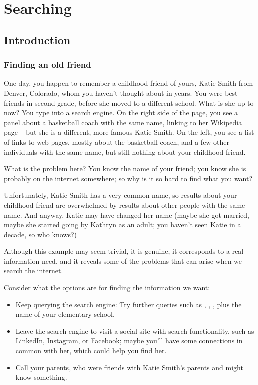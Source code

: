 \chapter{Searching}
\label{ch:searching}

\section{Introduction}
\label{sec:search-intro}

\subsection{Finding an old friend}

One day, you happen to remember a childhood friend of yours, Katie Smith from Denver, Colorado, whom you haven't thought about in  years.  You were best friends in second grade, before she moved to a different school.  What is she up to now?  You type  into a search engine.  On the right side of the page, you see a panel about a basketball coach with the same name, linking to her Wikipedia page -- but she is a different, more famous Katie Smith.  On the left, you see a list of links to web pages, mostly about the basketball coach, and a few other individuals with the same name, but still nothing about your childhood friend.

What is the problem here?  You know the name of your friend; you know she is probably on the internet somewhere; so why is it so hard to find what you want? 

Unfortunately, Katie Smith has a very common name, so results about your childhood friend are overwhelmed by results about other people with the same name.  And anyway, Katie may have changed her name (maybe she got married, maybe she started going by Kathryn  as an adult; you haven't seen Katie in a decade, so who knows?)

Although this example may seem trivial, it is genuine, 
it corresponds to a real information need, and it reveals some of the problems that can
arise when we search the internet.

Consider what the options are for finding the information we want:
\begin{itemize}
\item Keep querying the search engine: Try further queries such as , , ,  plus the name of your elementary school.

\item Leave the search engine to visit a social site with search functionality, such as LinkedIn, Instagram, or Facebook; maybe you'll have some connections in common with her, which could help you find her.

\item Call your parents, who were friends with Katie Smith's parents and might know something.

\end{itemize}

